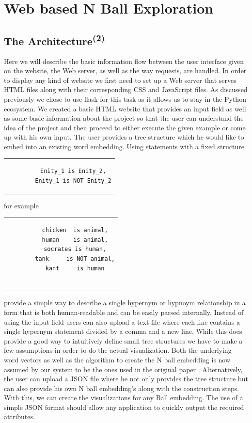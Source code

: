 \chapter{Web based N Ball Exploration}
\section[The Architecture]{The Architecture\textsuperscript{\hyperref[Oliver]{(2)}}}
\label{sec::arch}
Here we will describe the basic information flow between the user interface given on the website, the Web server, as well as the way requests, are handled. In order to display any kind of website we first need to set up a Web server that serves HTML files along with their corresponding CSS and JavaScript files. As discussed previously we chose to use flask for this task as it allows us to stay in the Python ecosystem. We created a basic HTML website that provides an input field as well as some basic information about the project so that the user can understand the idea of the project and then proceed to either execute the given example or come up with his own input. 
The user provides a tree structure which he would like to embed into an existing word embedding. Using statements with a fixed structure
\begin{center}
	
	\begin{tabular}{c}
		\begin{lstlisting}
		Enity_1 is Enity_2,
		Enity_1 is NOT Enity_2
		\end{lstlisting}
	\end{tabular}
	
	for example
	
	\begin{tabular}{c}
		\begin{lstlisting}
		chicken  is animal,
		human    is animal,
		socrates is human,
		tank     is NOT animal,
		kant     is human
		
		\end{lstlisting}
	\end{tabular}
\end{center}
provide a simple way to describe a single hypernym or hypnoym relationship in a form that is both human-readable and can be easily parsed internally. Instead of using the input field users can also upload a text file where each line contains a single hypernym statement divided by a comma and a new line. While this does provide a good way to intuitively define small tree structures we have to make a few assumptions in order to do the actual visualization. Both the underlying word vectors as well as the algorithm to create the N ball embedding is now assumed by our system to be the ones used in the original paper \cite{dong2018encoding}. Alternatively, the user can upload a JSON file where he not only provides the tree structure but can also provide his own N ball embedding's along with the construction steps. With this, we can create the visualizations for any Ball embedding. The use of a simple JSON format should allow any application to quickly output the required attributes. 
